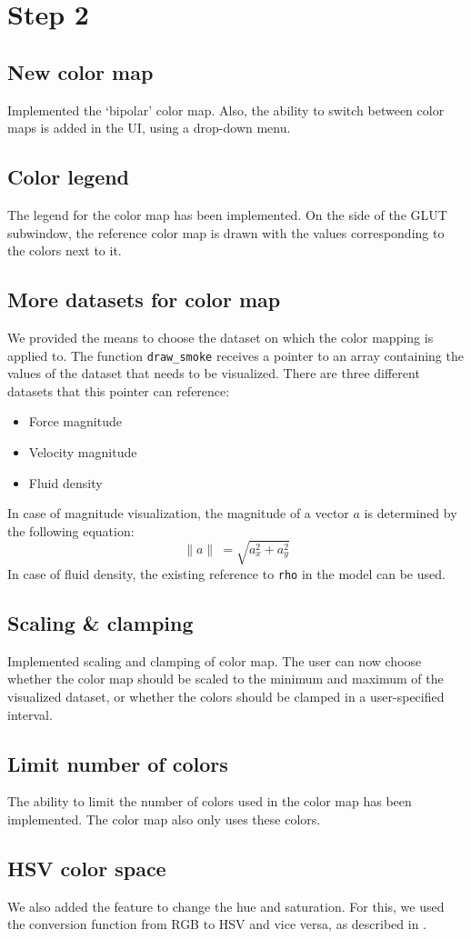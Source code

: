\section*{Step 2}
	\subsection*{New color map}
		Implemented the `bipolar' color map.
		Also, the ability to switch between color maps is added in the UI, using a drop-down menu.
	\subsection*{Color legend}
		The legend for the color map has been implemented.
		On the side of the GLUT subwindow, the reference color map is drawn with the values corresponding to the colors next to it.
	\subsection*{More datasets for color map}
		We provided the means to choose the dataset on which the color mapping is applied to.
		The function \texttt{draw\_smoke} receives a pointer to an array containing the values of the dataset that needs to be visualized.
		There are three different datasets that this pointer can reference:
		\begin{itemize}
			\item Force magnitude
			\item Velocity magnitude
			\item Fluid density
		\end{itemize}
		In case of magnitude visualization, the magnitude of a vector \(a\) is determined by the following equation:
		\[\| a \|\ = \sqrt{a_x^2 + a_y^2}\]
		In case of fluid density, the existing reference to \texttt{rho} in the model can be used.
	\subsection*{Scaling \& clamping}
		Implemented scaling and clamping of color map.
		The user can now choose whether the color map should be scaled to the minimum and maximum of the visualized dataset, or whether the colors should be clamped in a user-specified interval.
	\subsection*{Limit number of colors}
		The ability to limit the number of colors used in the color map has been implemented.
		The color map also only uses these colors.
	\subsection*{HSV color space}
		We also added the feature to change the hue and saturation.
		For this, we used the conversion function from RGB to HSV and vice versa, as described in \cite{telea2014data}.